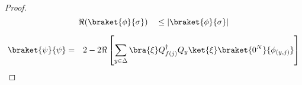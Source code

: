 \begin{proof}
\begin{equation}
\Re(\braket{\phi}{\sigma}) \quad \le \lvert \braket{\phi}{\sigma} \rvert
\end{equation}

\begin{eqnarray}
\braket{\psi}{\psi} & = & 2 - 2\Re\left[ \sum_{y \in \Delta} \bra{\xi}Q_{f(j)}^{\dagger}Q_y \ket{\xi}
                                                             \braket{0^N}{\phi_{(y,j)}} \right]
\end{eqnarray}

\end{proof}

